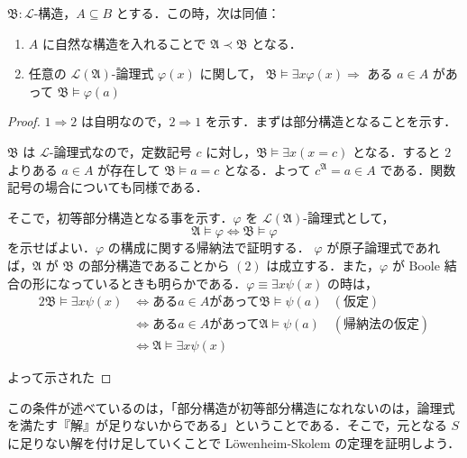 \documentclass[a4j,xelatex,ja=standard]{ltjsarticle}
\begin{document}
\begin{lemma}
 $\mathfrak{B}: \mathcal{L}$-構造，$A \subseteq B$ とする．この時，次は同値：
 \begin{enumerate}
  \item $A$ に自然な構造を入れることで $\mathfrak{A} \prec \mathfrak{B}$ となる．
  \item 任意の $\mathcal{L}(\mathfrak{A})$-論理式 $\varphi(x)$ に関して，
	 $\mathfrak{B} \models \exists x \varphi(x) \Longrightarrow$ ある $a \in A$ があって $\mathfrak{B} \models \varphi(a)$
 \end{enumerate}
\end{lemma}
\begin{proof}
 $1 \Longrightarrow 2$ は自明なので，$2 \Longrightarrow 1$ を示す．まずは部分構造となることを示す．
 
 $\mathfrak{B}$ は $\mathcal{L}$-論理式なので，定数記号 $c$ に対し，$\mathfrak{B} \models \exists x (x = c)$ となる．すると $2$ よりある $a \in A$ が存在して $\mathfrak{B} \models a = c$ となる．よって $c^\mathfrak{A} = a \in A$ である．関数記号の場合についても同様である．

 そこで，初等部分構造となる事を示す．$\varphi$ を $\mathcal{L}(\mathfrak{A})$-論理式として，
 \begin{equation}
  \mathfrak{A} \models \varphi \Leftrightarrow \mathfrak{B} \models \varphi\label{eqn:elementary}
 \end{equation} 
を示せばよい．$\varphi$ の構成に関する帰納法で証明する．
 $\varphi$ が原子論理式であれば，$\mathfrak{A}$ が $\mathfrak{B}$ の部分構造であることから $(2)$ は成立する．また，$\varphi$ が Boole 結合の形になっているときも明らかである．$\varphi \equiv \exists x \psi(x)$ の時は，
 \begin{alignat*}{2}
  \mathfrak{B} \models \exists x \psi(x) &\Leftrightarrow \text{ある} a \in A \text{があって} \mathfrak{B} \models \psi(a) & (\text{仮定})\\
  & \Leftrightarrow \text{ある} a \in A \text{があって} \mathfrak{A} \models \psi(a) & (\text{帰納法の仮定}) \\
  & \Leftrightarrow \mathfrak{A} \models \exists x \psi(x)
 \end{alignat*}

 よって示された\mbox{}
\end{proof}

この条件が述べているのは，「部分構造が初等部分構造になれないのは，論理式を満たす『解』が足りないからである」ということである．そこで，元となる $S$ に足りない解を付け足していくことで L\"{o}wenheim-Skolem の定理を証明しよう．
\end{document}
